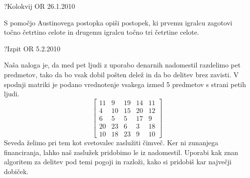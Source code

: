 
\begin{naloga}{?}{Kolokvij OR 26.1.2010}
\begin{vprasanje}[austin]
S pomočjo Austinovega postopka opiši postopek,
ki prvemu igralcu zagotovi točno četrtino celote
in drugemu igralcu točno tri četrtine celote.
\end{vprasanje}
\begin{odgovor}
\end{odgovor}
\end{naloga}


\begin{naloga}{?}{Izpit OR 5.2.2010}
\begin{vprasanje}[nadomestila]
Naša naloga je,
da med pet ljudi z uporabo denarnih nadomestil razdelimo pet predmetov,
tako da bo vsak dobil pošten delež in da bo delitev brez zavisti.
V spodnji matriki je podano vrednotenje vsakega izmed 5 predmetov
s strani petih ljudi.
$$
\begin{bmatrix}
11 &  9 & 19 & 14 & 11 \\
 4 & 10 & 15 & 20 & 12 \\
 6 &  5 &  5 & 17 & 9  \\
20 & 23 &  6 &  3 & 18 \\
10 & 18 & 23 &  9 & 10
\end{bmatrix}
$$
Seveda želimo pri tem kot svetovalec zaslužiti čimveč.
Ker ni zunanjega financiranja, lahko naš zaslužek pridobimo le iz nadomestil.
Uporabi kak znan algoritem za delitev pod temi pogoji in razloži,
kako si pridobiš kar največji dobiček.
\end{vprasanje}
\begin{odgovor}
\end{odgovor}
\end{naloga}



